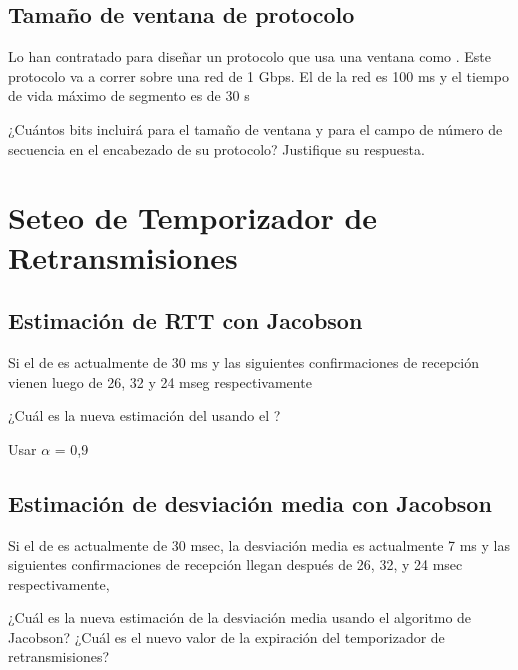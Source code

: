 \documentclass[12pt]{report}
\begin{document}
\begin{exer}
	\subsection{Tamaño de ventana de protocolo \sthree}
	Lo han contratado para diseñar un protocolo que usa una ventana como . Este
	protocolo va a correr sobre una red de 1 Gbps. El  de la red es 100 ms y el tiempo de vida
	máximo de segmento es de 30 s

	¿Cuántos bits incluirá para el tamaño de ventana y para el campo de
	número de secuencia en el encabezado de su protocolo? Justifique su respuesta.

\end{exer}

\section{Seteo de Temporizador de Retransmisiones}

\begin{exer}
	\subsection{Estimación de RTT con Jacobson \stwo}

	Si el  de  es actualmente de 30 ms y las siguientes confirmaciones de
	recepción vienen luego de 26, 32 y 24 mseg respectivamente

	¿Cuál es la nueva estimación del  usando el ?

	Usar $\alpha$ = 0,9
\end{exer}

\begin{exer}
	\subsection{Estimación de desviación media con Jacobson \sthree}
	Si el  de  es actualmente de 30 msec, la desviación media es actualmente 7
	ms y las siguientes confirmaciones de recepción llegan después de 26, 32, y 24 msec
	respectivamente,

	¿Cuál es la nueva estimación de la desviación media usando el algoritmo de Jacobson?
	¿Cuál es el nuevo valor de la expiración del temporizador de retransmisiones?

\end{exer}
\end{document}

